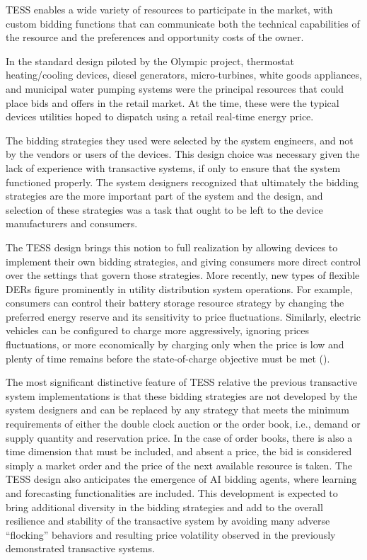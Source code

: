 TESS enables a wide variety of resources to participate in the market, with custom bidding functions that can communicate both the technical capabilities of the resource and the preferences and opportunity costs of the owner.

In the standard design piloted by the Olympic project, thermostat heating/cooling devices, diesel generators, micro-turbines, white goods appliances, and municipal water pumping systems were the principal resources that could place bids and offers in the retail market.  At the time, these were the typical devices utilities hoped to dispatch using a retail real-time energy price. 

The bidding strategies they used were selected by the system engineers, and not by the vendors or users of the devices. This design choice was necessary given the lack of experience with transactive systems, if only to ensure that the system functioned properly. The system designers recognized that ultimately the bidding strategies are the more important part of the system and the design, and selection of these strategies was a task that ought to be left to the device manufacturers and consumers.

The TESS design brings this notion to full realization by allowing devices to implement their own bidding strategies, and giving consumers more direct control over the settings that govern those strategies.  More recently, new types of flexible DERs figure prominently in utility distribution system operations. For example, consumers can control their battery storage resource strategy by changing the preferred energy reserve and its sensitivity to price fluctuations.  Similarly, electric vehicles can be configured to charge more aggressively, ignoring prices fluctuations, or more economically by charging only when the price is low and plenty of time remains before the state-of-charge objective must be met (\cite{behboodi2016electric}). 

The most significant distinctive feature of TESS relative the previous transactive system implementations is that these bidding strategies are not developed by the system designers and can be replaced by any strategy that meets the minimum requirements of either the double clock auction or the order book, i.e., demand or supply quantity and reservation price.  In the case of order books, there is also a time dimension that must be included, and absent a price, the bid is considered simply a market order and the price of the next available resource is taken.  The TESS design also anticipates the emergence of AI bidding agents, where learning and forecasting functionalities are included. This development is expected to bring additional diversity in the bidding strategies and add to the overall resilience and stability of the transactive system by avoiding many adverse ``flocking'' behaviors and resulting price volatility observed in the previously demonstrated transactive systems.

